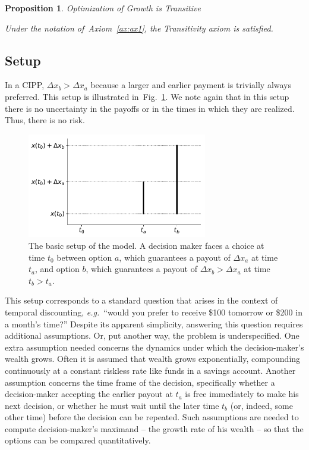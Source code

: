 \documentclass[11pt]{article}
\newtheorem{proposition}{Proposition}
\newcommand{\Aref}[1]{Axiom~\ref{ax:#1}}
\newcommand{\eg}{{\it e.g.}\ }
\newcommand{\flabel}[1]{\label{fig:#1}}
\newcommand{\fref}[1]{Fig.~\ref{fig:#1}}
\newcommand{\Dx}{\Delta x}
\numberwithin{equation}{section}
\begin{document}
\begin{proposition}{Optimization of Growth is Transitive}

Under the notation of~\Aref{ax1}, the Transitivity axiom is satisfied.
\label{prop:trans}
\end{proposition}

\subsection{Setup}

In a CIPP, $\Dx_b>\Dx_a$ because a larger and earlier payment is trivially always preferred. This setup is illustrated in~\fref{basicsetup}. We note again that in this setup there is no uncertainty in the payoffs or in the times in which they are realized. Thus, there is no risk.

\begin{figure}[!htb]
\centering
\includegraphics[width=0.7\textwidth]{./figures/setup.pdf}
\caption{
The basic setup of the model. A decision maker faces a choice at time $t_0$ between option $a$, which guarantees a payout of $\Dx_a$ at time $t_a$, and option $b$, which guarantees a payout of $\Dx_b>\Dx_a$ at time $t_b>t_a$.
}
\flabel{basicsetup}
\end{figure}

This setup corresponds to a standard question that arises in the context of temporal discounting, \eg ``would you prefer to receive \$100 tomorrow or \$200 in a month's time?'' Despite its apparent simplicity, answering this question requires additional assumptions. Or, put another way, the problem is underspecified. One extra assumption needed concerns the dynamics under which the decision-maker's wealth grows. Often it is assumed that wealth grows exponentially, compounding continuously at a constant riskless rate like funds in a savings account. Another assumption concerns the time frame of the decision, specifically whether a decision-maker accepting the earlier payout at $t_a$ is free immediately to make his next decision, or whether he must wait until the later time $t_b$ (or, indeed, some other time) before the decision can be repeated. Such assumptions are needed to compute decision-maker's maximand -- the growth rate of his wealth -- so that the options can be compared quantitatively.
\end{document}
